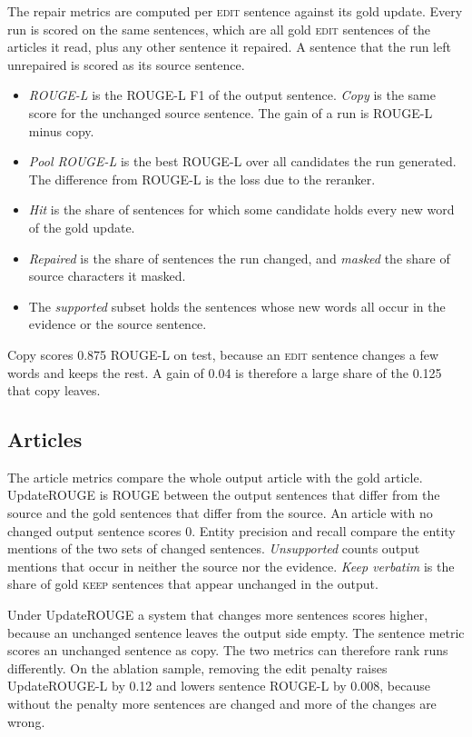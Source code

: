 \documentclass[]{paper}
\newcommand{\keep}{\textsc{keep}}
\newcommand{\edit}{\textsc{edit}}
\begin{document}
The repair metrics are computed per \edit{} sentence against its gold update. Every run is scored on the same sentences, which are all gold \edit{} sentences of the articles it read, plus any other sentence it repaired. A sentence that the run left unrepaired is scored as its source sentence.
\begin{itemize}
\item \emph{ROUGE-L} is the ROUGE-L F1 of the output sentence. \emph{Copy} is the same score for the unchanged source sentence. The gain of a run is ROUGE-L minus copy.
\item \emph{Pool ROUGE-L} is the best ROUGE-L over all candidates the run generated. The difference from ROUGE-L is the loss due to the reranker.
\item \emph{Hit} is the share of sentences for which some candidate holds every new word of the gold update.
\item \emph{Repaired} is the share of sentences the run changed, and \emph{masked} the share of source characters it masked.
\item The \emph{supported} subset holds the sentences whose new words all occur in the evidence or the source sentence.
\end{itemize}

Copy scores 0.875 ROUGE-L on test, because an \edit{} sentence changes a few words and keeps the rest. A gain of 0.04 is therefore a large share of the 0.125 that copy leaves.

\subsection{Articles}

The article metrics compare the whole output article with the gold article. UpdateROUGE \citep{iv-etal-2022-fruit} is ROUGE between the output sentences that differ from the source and the gold sentences that differ from the source. An article with no changed output sentence scores 0. Entity precision and recall compare the entity mentions of the two sets of changed sentences. \emph{Unsupported} counts output mentions that occur in neither the source nor the evidence. \emph{Keep verbatim} is the share of gold \keep{} sentences that appear unchanged in the output.

Under UpdateROUGE a system that changes more sentences scores higher, because an unchanged sentence leaves the output side empty. The sentence metric scores an unchanged sentence as copy. The two metrics can therefore rank runs differently. On the ablation sample, removing the edit penalty raises UpdateROUGE-L by 0.12 and lowers sentence ROUGE-L by 0.008, because without the penalty more sentences are changed and more of the changes are wrong.
\end{document}
